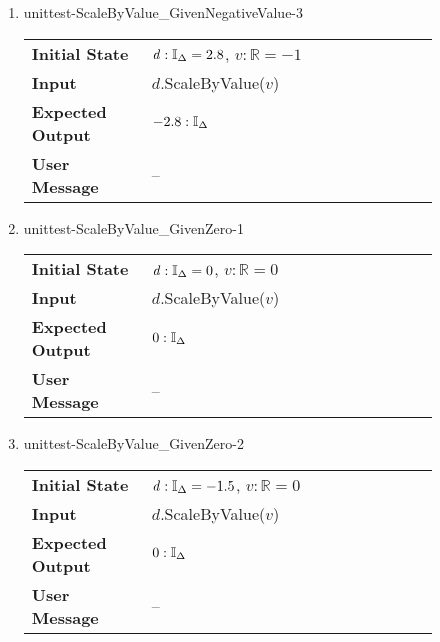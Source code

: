 \begin{enumerate}
    \item{unittest-ScaleByValue\_GivenNegativeValue-3}
    \begin{table}[H]
        \centering
        \begin{tabular}{P{0.25\linewidth}P{0.6\linewidth}}
            \toprule
            \textbf{Initial State} & $\mathit{d} : \mathbb{I}_{\Delta} = 2.8$,
            $v : \mathbb{R} = -1$ \\
            \textbf{Input} & $\mathit{d}$.ScaleByValue($\mathit{v}$) \\
            \midrule
            \textbf{Expected Output} & $-2.8 : \mathbb{I}_{\Delta}$ \\
            \textbf{User Message} & -- \\ \bottomrule
        \end{tabular}
    \end{table}

    \item{unittest-ScaleByValue\_GivenZero-1}
    \begin{table}[H]
        \centering
        \begin{tabular}{P{0.25\linewidth}P{0.6\linewidth}}
            \toprule
            \textbf{Initial State} & $\mathit{d} : \mathbb{I}_{\Delta} = 0$,
            $v : \mathbb{R} = 0$ \\
            \textbf{Input} & $\mathit{d}$.ScaleByValue($\mathit{v}$) \\
            \midrule
            \textbf{Expected Output} & $0 : \mathbb{I}_{\Delta}$ \\
            \textbf{User Message} & -- \\ \bottomrule
        \end{tabular}
    \end{table}

    \item{unittest-ScaleByValue\_GivenZero-2}
    \begin{table}[H]
        \centering
        \begin{tabular}{P{0.25\linewidth}P{0.6\linewidth}}
            \toprule
            \textbf{Initial State} & $\mathit{d} : \mathbb{I}_{\Delta} = -1.5$,
            $v : \mathbb{R} = 0$ \\
            \textbf{Input} & $\mathit{d}$.ScaleByValue($\mathit{v}$) \\
            \midrule
            \textbf{Expected Output} & $0 : \mathbb{I}_{\Delta}$ \\
            \textbf{User Message} & -- \\ \bottomrule
        \end{tabular}
    \end{table}


\end{enumerate}
